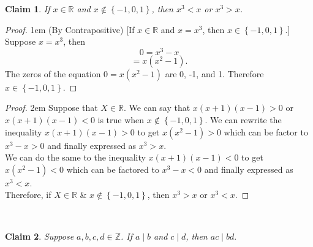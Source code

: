 \documentclass[12 pt]{article}
\newcommand{\R}{\mathbb{R}}
\newcommand{\Z}{\mathbb{Z}}
\newcommand{\set}[1]{\left\{#1\right\}}
\newcommand{\divides}{\! \mid \!}
\theoremstyle{definition}
\theoremstyle{plain}
\theoremstyle{mytheorem}
\newtheorem{claim}{Claim}
\theoremstyle{myexample}
\theoremstyle{mydefinition}
\begin{document}
\begin{claim}
If $x \in \R$ and $x \notin \set{-1,0,1}$, then $x^3<x$ or $x^3>x$.
\end{claim}

\begin{proof} \openup 1em (By Contrapositive) [If $x \in \R$ and $x = x^3$, then $x \in \set{-1,0,1}$.]  Suppose $x=x^3$, then 
 \[0=x^3-x\]
 \[=x(x^2-1).\]
 The zeros of the equation $0=x(x^2-1)$ are 0, -1, and 1.  Therefore $x \in \set{-1,0,1}$.
\end{proof}
\begin{center} \underline{\hspace{\textwidth}} \end{center}

\begin{proof} \openup 2em  Suppose that $X \in \R$.  We can say that $x(x+1)(x-1)>0$ or $x(x+1)(x-1)<0$ is true when $x \notin \set{-1,0,1}$.  We can rewrite the inequality $x(x+1)(x-1)>0$ to get $x(x^2-1)>0$ which can be factor to $x^3-x>0$ and finally expressed as $x^3>x$.\\
  We can do the same to the inequality $x(x+1)(x-1)<0$ to get $x(x^2-1)<0$ which can be factored to $x^3-x<0$ and finally expressed as $x^3<x$.\\
  Therefore, if $X \in \R$ \& $x \notin \set{-1,0,1}$, then $x^3>x$ or $x^3<x$.
\end{proof}
\begin{center} \underline{\hspace{\textwidth}}\\ \underline{\hspace{\textwidth}} \end{center}
\begin{claim}  Suppose $a,b,c,d \in \Z$.  If $a \divides b$ and $c \divides d$, then $ac \divides bd.$
\end{claim}
\end{document}
